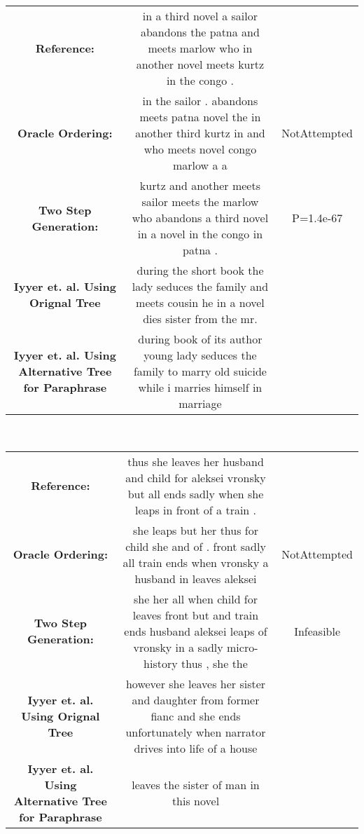 \documentclass{article}
\begin{document}
\begin{tabular}{ c c c }
\textbf{Reference:	}  & in a third novel a sailor abandons the patna and meets marlow who in another novel meets kurtz in the congo . &  \\
\textbf{Oracle Ordering: 	}  & in the sailor . abandons meets patna novel the in another third kurtz in and who meets novel congo marlow a a & NotAttempted \\
\textbf{Two Step Generation:	}  & kurtz and another meets sailor meets the marlow who abandons a third novel in a novel in the congo in patna . & P=1.4e-67 \\
\textbf{Iyyer et. al. Using Orignal Tree}  & during the short book the lady seduces the family and meets cousin he in a novel dies sister from the mr. &  \\
\textbf{Iyyer et. al. Using Alternative Tree for Paraphrase}  & during book of its author young lady seduces the family to marry old suicide while i marries himself in marriage &  \\
\end{tabular} \\

\begin{tabular}{ c c c }
\textbf{Reference:	}  & thus she leaves her husband and child for aleksei vronsky but all ends sadly when she leaps in front of a train . &  \\
\textbf{Oracle Ordering: 	}  & she leaps but her thus for child she and of . front sadly all train ends when vronsky a husband in leaves aleksei & NotAttempted \\
\textbf{Two Step Generation:	}  & she her all when child for leaves front but and train ends husband aleksei leaps of vronsky in a sadly micro-history thus , she the & Infeasible \\
\textbf{Iyyer et. al. Using Orignal Tree}  & however she leaves her sister and daughter from former fianc and she ends unfortunately when narrator drives into life of a house &  \\
\textbf{Iyyer et. al. Using Alternative Tree for Paraphrase}  & leaves the sister of man in this novel &  \\
\end{tabular} \\
\end{document}
